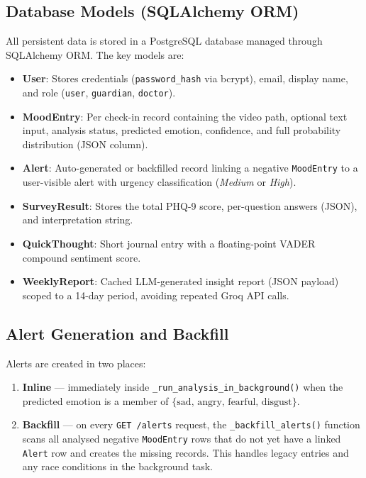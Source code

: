 \documentclass[12pt,a4paper]{article}
\begin{document}
\subsection{Database Models (SQLAlchemy ORM)}

All persistent data is stored in a PostgreSQL database managed through
SQLAlchemy ORM. The key models are:

\begin{itemize}[leftmargin=1.5em]
  \item \textbf{User}: Stores credentials (\texttt{password\_hash} via
        bcrypt), email, display name, and role (\texttt{user},
        \texttt{guardian}, \texttt{doctor}).
  \item \textbf{MoodEntry}: Per check-in record containing the video path,
        optional text input, analysis status, predicted emotion, confidence,
        and full probability distribution (JSON column).
  \item \textbf{Alert}: Auto-generated or backfilled record linking a
        negative \texttt{MoodEntry} to a user-visible alert with urgency
        classification (\textit{Medium} or \textit{High}).
  \item \textbf{SurveyResult}: Stores the total PHQ-9 score, per-question
        answers (JSON), and interpretation string.
  \item \textbf{QuickThought}: Short journal entry with a
        floating-point VADER compound sentiment score.
  \item \textbf{WeeklyReport}: Cached LLM-generated insight report (JSON
        payload) scoped to a 14-day period, avoiding repeated Groq API calls.
\end{itemize}

\subsection{Alert Generation and Backfill}

Alerts are created in two places:

\begin{enumerate}[leftmargin=2em]
  \item \textbf{Inline} — immediately inside \texttt{\_run\_analysis\_in\_background()} when the
        predicted emotion is a member of
        $\{\text{sad, angry, fearful, disgust}\}$.
  \item \textbf{Backfill} — on every \texttt{GET /alerts} request, the
        \texttt{\_backfill\_alerts()} function scans all analysed negative
        \texttt{MoodEntry} rows that do not yet have a linked \texttt{Alert}
        row and creates the missing records. This handles legacy entries and
        any race conditions in the background task.
\end{enumerate}
\end{document}
